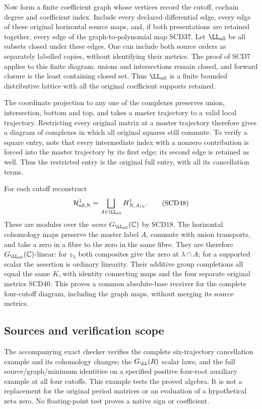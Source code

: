 \documentclass[11pt,a4paper]{article}
\theoremstyle{definition}\newtheorem{definition}[theorem]{Definition}
\newcommand{\C}{\mathbb C}\newcommand{\R}{\mathbb R}
\begin{document}
Now form a finite coefficient graph whose vertices record the cutoff,
cochain degree and coefficient index. Include every declared differential
edge, every edge of these original horizontal source maps, and, if both
presentations are retained together, every edge of the graph-to-polynomial
map SCD37. Let \(\LL_{\rm all}\) be all subsets closed under these edges.
One can include both source orders as separately labelled copies, without
identifying their metrics. The proof of SCD7 applies to this finite
diagram: unions and intersections remain closed, and forward closure is
the least containing closed set. Thus \(\LL_{\rm all}\) is a finite bounded
distributive lattice with all the original coefficient supports retained.

The coordinate projection to any one of the complexes preserves union,
intersection, bottom and top, and takes a master trajectory to a valid
local trajectory. Restricting every original matrix at a master trajectory
therefore gives a diagram of complexes in which all original squares
still commute. To verify a square entry, note that every intermediate
index with a nonzero contribution is forced into the master trajectory
by its first edge; its second edge is retained as well. Thus the restricted
entry is the original full entry, with all its cancellation terms.

For each cutoff reconstruct
\[
 \mathcal H_{\rm all,N}^1
 =\bigsqcup_{A\in\LL_{\rm all}}H^1_{N,A|_N}.
 \tag{SCD48}
\]
These are modules over the \emph{same} \(G_{\LL_{\rm all}}(\C)\) by
SCD18. The horizontal cohomology maps preserve the master label \(A\),
commute with union transports, and take a zero in a fibre to the zero in
the same fibre. They are therefore \(G_{\LL_{\rm all}}(\C)\)-linear:
for \(z_\lambda\) both composites give the zero at \(\lambda\cap A\);
for a supported scalar the assertion is ordinary linearity.
Their additive group completions all equal the same \(K\), with identity
connecting maps and the four separate original metrics SCD40.
This proves a common absolute-base receiver for the complete four-cutoff
diagram, including the graph maps, without merging its source metrics.


\subsection{Sources and verification scope}

The accompanying exact checker verifies the complete six-trajectory
cancellation example and its cohomology changes; the \(G_{\LL}(R)\)
scalar laws; and the full source/graph/minimum identities on a
specified positive four-root auxiliary example at all four cutoffs.
This example tests the proved algebra. It is not a replacement
for the original period matrices or an evaluation of a hypothetical
zeta zero. No floating-point test proves a native sign or coefficient.
\end{document}
